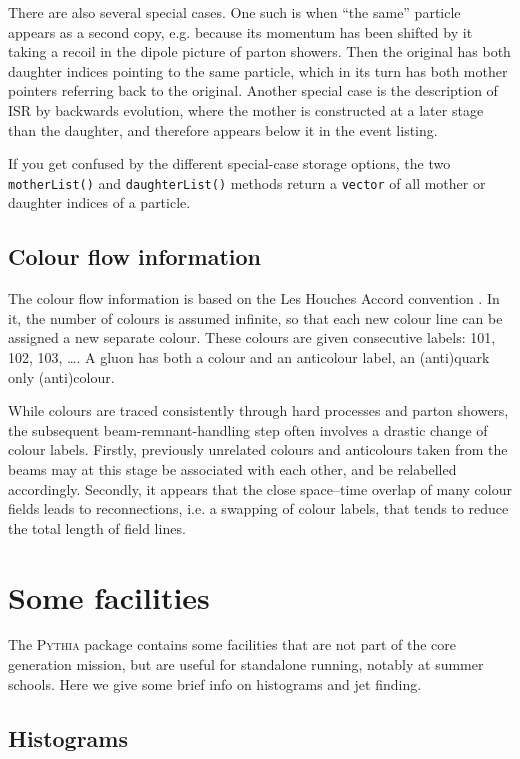 \documentclass[12pt,a4paper]{article}
\begin{document}
There are also several special cases. One such is when ``the same''
particle appears as a second copy, e.g. because its momentum has 
been shifted by it taking a recoil in the dipole picture of parton
showers. Then the original has both daughter indices pointing to the
same particle, which in its turn has both mother pointers referring
back to the original. Another special case is the description of 
ISR by backwards evolution, where the mother is constructed at a 
later stage than the daughter, and therefore appears below it in the 
event listing. 

If you get confused by the different special-case storage options, the 
two \texttt{motherList()} and \texttt{daughterList()} methods 
return a \texttt{vector} of all mother or daughter indices of 
a particle.

\subsection{Colour flow information}

The colour flow information is based on the Les Houches Accord
convention \cite{leshouchesaccord}. In it, the number of colours
is assumed infinite, so that each new colour line can be assigned
a new separate colour. These colours are given consecutive labels:
101, 102, 103, \ldots . A gluon has both a colour and an anticolour
label, an (anti)quark only (anti)colour. 

While colours are traced consistently through hard processes and 
parton showers, the subsequent beam-remnant-handling step often 
involves a drastic change of colour labels. Firstly, previously 
unrelated colours and anticolours taken from the beams may at this
stage be associated with each other, and be relabelled accordingly. 
Secondly, it appears that the close space--time overlap of many 
colour fields leads to reconnections, i.e. a swapping of colour labels, 
that tends to reduce the total length of field lines.

\section{Some facilities}

The \textsc{Pythia} package contains some facilities that are 
not part of the core generation mission, but are useful
for standalone running, notably at summer schools. Here we give
some brief info on histograms and jet finding.

\subsection{Histograms}
\end{document}
